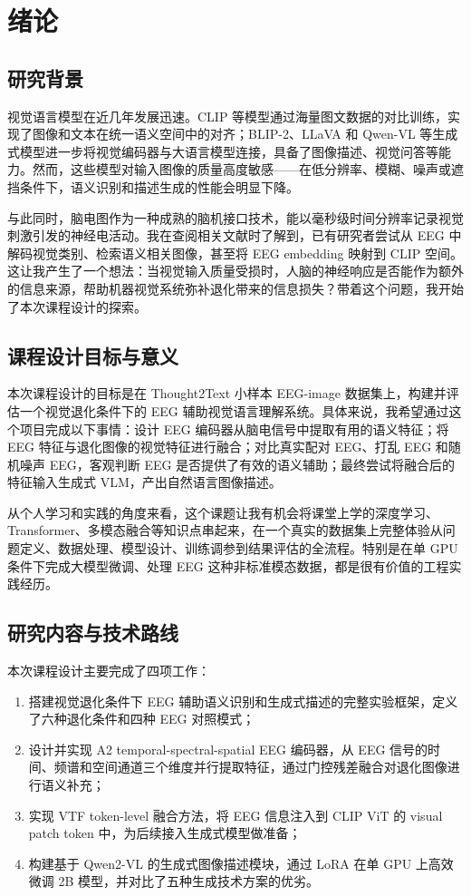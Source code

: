 \section{绪论}

\subsection{研究背景}

视觉语言模型在近几年发展迅速。CLIP 等模型通过海量图文数据的对比训练，实现了图像和文本在统一语义空间中的对齐；BLIP-2、LLaVA 和 Qwen-VL 等生成式模型进一步将视觉编码器与大语言模型连接，具备了图像描述、视觉问答等能力。然而，这些模型对输入图像的质量高度敏感——在低分辨率、模糊、噪声或遮挡条件下，语义识别和描述生成的性能会明显下降。

与此同时，脑电图作为一种成熟的脑机接口技术，能以毫秒级时间分辨率记录视觉刺激引发的神经电活动。我在查阅相关文献时了解到，已有研究者尝试从 EEG 中解码视觉类别、检索语义相关图像，甚至将 EEG embedding 映射到 CLIP 空间。这让我产生了一个想法：当视觉输入质量受损时，人脑的神经响应是否能作为额外的信息来源，帮助机器视觉系统弥补退化带来的信息损失？带着这个问题，我开始了本次课程设计的探索。

\subsection{课程设计目标与意义}

本次课程设计的目标是在 Thought2Text 小样本 EEG-image 数据集上，构建并评估一个视觉退化条件下的 EEG 辅助视觉语言理解系统。具体来说，我希望通过这个项目完成以下事情：设计 EEG 编码器从脑电信号中提取有用的语义特征；将 EEG 特征与退化图像的视觉特征进行融合；对比真实配对 EEG、打乱 EEG 和随机噪声 EEG，客观判断 EEG 是否提供了有效的语义辅助；最终尝试将融合后的特征输入生成式 VLM，产出自然语言图像描述。

从个人学习和实践的角度来看，这个课题让我有机会将课堂上学的深度学习、Transformer、多模态融合等知识点串起来，在一个真实的数据集上完整体验从问题定义、数据处理、模型设计、训练调参到结果评估的全流程。特别是在单 GPU 条件下完成大模型微调、处理 EEG 这种非标准模态数据，都是很有价值的工程实践经历。

\subsection{研究内容与技术路线}

本次课程设计主要完成了四项工作：

\begin{enumerate}
  \item 搭建视觉退化条件下 EEG 辅助语义识别和生成式描述的完整实验框架，定义了六种退化条件和四种 EEG 对照模式；
  \item 设计并实现 A2 temporal-spectral-spatial EEG 编码器，从 EEG 信号的时间、频谱和空间通道三个维度并行提取特征，通过门控残差融合对退化图像进行语义补充；
  \item 实现 VTF token-level 融合方法，将 EEG 信息注入到 CLIP ViT 的 visual patch token 中，为后续接入生成式模型做准备；
  \item 构建基于 Qwen2-VL 的生成式图像描述模块，通过 LoRA 在单 GPU 上高效微调 2B 模型，并对比了五种生成技术方案的优劣。
\end{enumerate}

